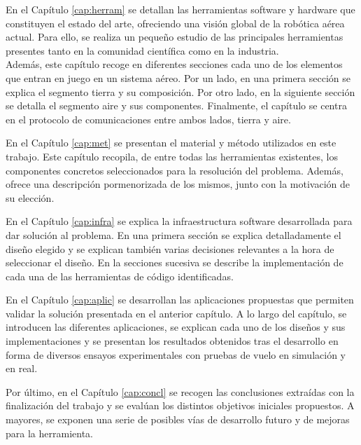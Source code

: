 \documentclass[../main.tex]{subfiles}
\begin{document}
En el Capítulo \ref{cap:herram} se detallan las herramientas software y hardware que constituyen el estado del arte, ofreciendo una visión global de la robótica aérea actual. Para ello, se realiza un pequeño estudio de las principales herramientas presentes tanto en la comunidad científica como en la industria. \\
Además, este capítulo recoge en diferentes secciones cada uno de los elementos que entran en juego en un sistema aéreo. Por un lado, en una primera sección se explica el segmento tierra y su composición. Por otro lado, en la siguiente sección se detalla el segmento aire y sus componentes. Finalmente, el capítulo se centra en el protocolo de comunicaciones entre ambos lados, tierra y aire.

En el Capítulo \ref{cap:met} se presentan el material y método utilizados en este trabajo. Este capítulo recopila, de entre todas las herramientas existentes, los componentes concretos seleccionados para la resolución del problema. Además, ofrece una descripción pormenorizada de los mismos, junto con la motivación de su elección. 

En el Capítulo \ref{cap:infra} se explica la infraestructura software desarrollada para dar solución al problema. En una primera sección se explica detalladamente el diseño elegido y se explican también varias decisiones relevantes a la hora de seleccionar el diseño. En la secciones sucesiva se describe la implementación de cada una de las herramientas de código identificadas. 

En el Capítulo \ref{cap:aplic} se desarrollan las aplicaciones propuestas que permiten validar la solución presentada en el anterior capítulo. A lo largo del capítulo, se introducen las diferentes aplicaciones, se explican cada uno de los diseños y sus implementaciones y se presentan los resultados obtenidos tras el desarrollo en forma de diversos ensayos experimentales con pruebas de vuelo en simulación y en real.

Por último, en el Capítulo \ref{cap:concl} se recogen las conclusiones extraídas con la finalización del trabajo y se evalúan los distintos objetivos iniciales propuestos. A mayores, se exponen una serie de posibles vías de desarrollo futuro y de mejoras para la herramienta.
\end{document}
